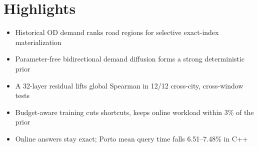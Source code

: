 \documentclass[preprint,12pt]{elsarticle}
\begin{document}
\section*{Highlights}
\begin{itemize}
  \item Historical OD demand ranks road regions for selective exact-index materialization
  \item Parameter-free bidirectional demand diffusion forms a strong deterministic prior
  \item A 32-layer residual lifts global Spearman in 12/12 cross-city, cross-window tests
  \item Budget-aware training cuts shortcuts, keeps online workload within 3\% of the prior
  \item Online answers stay exact; Porto mean query time falls 6.51--7.48\% in C++
\end{itemize}
\end{document}
